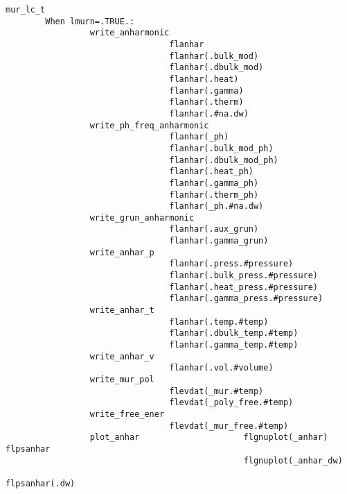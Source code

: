 \documentclass[12pt,a4paper,twoside]{report}
\begin{document}
\begin{footnotesize}
\begin{verbatim}
mur_lc_t        
        When lmurn=.TRUE.: 
                 write_anharmonic
                                 flanhar
                                 flanhar(.bulk_mod)
                                 flanhar(.dbulk_mod)
                                 flanhar(.heat)
                                 flanhar(.gamma)
                                 flanhar(.therm)
                                 flanhar(.#na.dw)
                 write_ph_freq_anharmonic
                                 flanhar(_ph)
                                 flanhar(.bulk_mod_ph)
                                 flanhar(.dbulk_mod_ph)
                                 flanhar(.heat_ph)
                                 flanhar(.gamma_ph)
                                 flanhar(.therm_ph)
                                 flanhar(_ph.#na.dw)
                 write_grun_anharmonic
                                 flanhar(.aux_grun)
                                 flanhar(.gamma_grun)
                 write_anhar_p
                                 flanhar(.press.#pressure)
                                 flanhar(.bulk_press.#pressure)
                                 flanhar(.heat_press.#pressure)
                                 flanhar(.gamma_press.#pressure)
                 write_anhar_t
                                 flanhar(.temp.#temp)
                                 flanhar(.dbulk_temp.#temp)
                                 flanhar(.gamma_temp.#temp)
                 write_anhar_v
                                 flanhar(.vol.#volume)
                 write_mur_pol
                                 flevdat(_mur.#temp)
                                 flevdat(_poly_free.#temp)
                 write_free_ener
                                 flevdat(_mur_free.#temp)
                 plot_anhar                     flgnuplot(_anhar)  flpsanhar
                                                flgnuplot(_anhar_dw) 
                                                            flpsanhar(.dw)
                                                

\end{verbatim}
\end{footnotesize}
\end{document}
